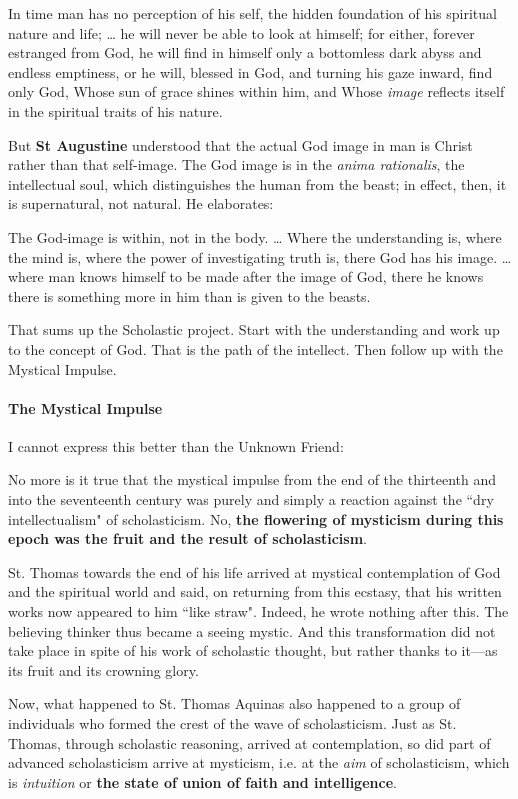 \begin{quotex}
In time man has no perception of his self, the hidden foundation of his spiritual nature and life; … he will never be able to look at himself; for either, forever estranged from God, he will find in himself only a bottomless dark abyss and endless emptiness, or he will, blessed in God, and turning his gaze inward, find only God, Whose sun of grace shines within him, and Whose \emph{image} reflects itself in the spiritual traits of his nature. 

\end{quotex}
But \textbf{St Augustine} understood that the actual God image in man is Christ rather than that self-image. The God image is in the \emph{anima rationalis}, the intellectual soul, which distinguishes the human from the beast; in effect, then, it is supernatural, not natural. He elaborates:

\begin{quotex}
The God-image is within, not in the body. … Where the understanding is, where the mind is, where the power of investigating truth is, there God has his image. … where man knows himself to be made after the image of God, there he knows there is something more in him than is given to the beasts. 

\end{quotex}
That sums up the Scholastic project. Start with the understanding and work up to the concept of God. That is the path of the intellect. Then follow up with the Mystical Impulse.

\paragraph{The Mystical Impulse}
I cannot express this better than the Unknown Friend:

\begin{quotex}
No more is it true that the mystical impulse from the end of the thirteenth and into the seventeenth century was purely and simply a reaction against the ``dry intellectualism" of scholasticism. No, \textbf{the flowering of mysticism during this epoch was the fruit and the result of scholasticism}.

St. Thomas towards the end of his life arrived at mystical contemplation of God and the spiritual world and said, on returning from this ecstasy, that his written works now appeared to him ``like straw". Indeed, he wrote nothing after this. The believing thinker thus became a seeing mystic. And this transformation did not take place in spite of his work of scholastic thought, but rather thanks to it—as its fruit and its crowning glory.

Now, what happened to St. Thomas Aquinas also happened to a group of individuals who formed the crest of the wave of scholasticism. Just as St. Thomas, through scholastic reasoning, arrived at contemplation, so did part of advanced scholasticism arrive at mysticism, i.e. at the \emph{aim} of scholasticism, which is \emph{intuition} or \textbf{the state of union of faith and intelligence}. 

\end{quotex}
